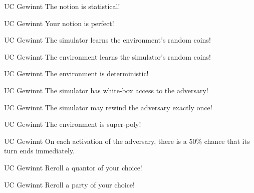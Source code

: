 \documentclass[avery5371,frame,grid]{flashcards}
\begin{document}
\begin{flashcard}{UC Gewinnt}
  The notion is statistical!
\end{flashcard}

\begin{flashcard}{UC Gewinnt}
  Your notion is perfect!
\end{flashcard}
\begin{flashcard}{UC Gewinnt}
  The simulator learns the environment's random coins!
\end{flashcard}
\begin{flashcard}{UC Gewinnt}
  The environment learns the simulator's random coins!
\end{flashcard}
\begin{flashcard}{UC Gewinnt}
  The environment is deterministic!
\end{flashcard}
\begin{flashcard}{UC Gewinnt}
  The simulator has white-box access to the adversary!
\end{flashcard}
\begin{flashcard}{UC Gewinnt}
  The simulator may rewind the adversary exactly once!
\end{flashcard}
\begin{flashcard}{UC Gewinnt}
  The environment is super-poly!
\end{flashcard}
\begin{flashcard}{UC Gewinnt}
  On each activation of the adversary, there is a 50\% chance that its turn ends immediately. 
\end{flashcard}
\begin{flashcard}{UC Gewinnt}
  Reroll a quantor of your choice!
\end{flashcard}
\begin{flashcard}{UC Gewinnt}
  Reroll a party of your choice!
\end{flashcard}
\end{document}
